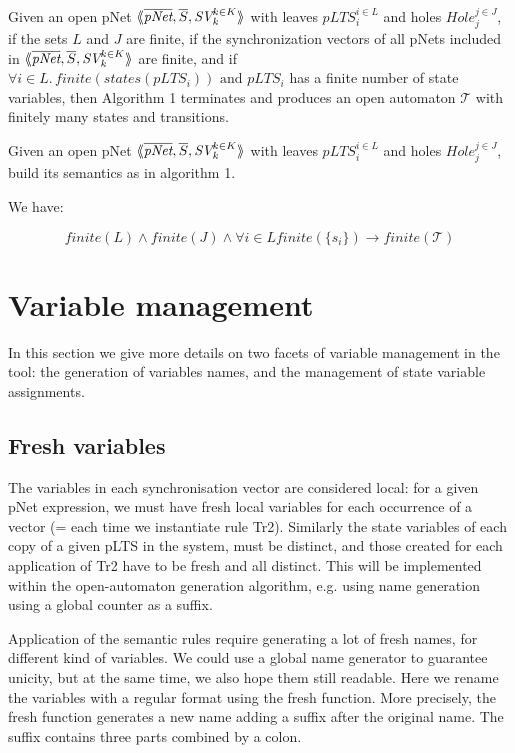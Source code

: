 \documentclass{lncs/llncs}
\begin{document}
\begin{theorem}\\
Given an open pNet $\mylangle \overline{\pNet},\overline{S}, \symb{SV}_k^{k\in K}\myrangle$ with leaves $pLTS_i^{i\in L}$ and holes $Hole_j^{j\in
  J}$, if the sets $L$ and $J$ are finite, if the synchronization vectors of all pNets 
  included in  $\mylangle \overline{\pNet},\overline{S}, \symb{SV}_k^{k\in K}\myrangle$ 
  are finite, and if
$\forall i \in L.\, finite{(states(pLTS_i))} \text{ and } pLTS_i$
has a finite number of state variables, then Algorithm 1 terminates
and produces an open automaton 
$\mathcal{T}$ with finitely many states and transitions.


Given an open pNet $\mylangle \overline{\pNet},\overline{S}, \symb{SV}_k^{k\in
    K}\myrangle$ with leaves $pLTS_i^{i\in L}$ and holes $Hole_j^{j\in
  J}$,
build its semantics as in algorithm 1.

We have:

$$ finite{(L)} \land finite{(J)} \land \forall i \in L finite{(\{s_i\})}
  \to finite{(\mathcal{T})}$$
\end{theorem}


\section{Variable management}
In this section we give more details on two facets of variable
management in the tool: the generation of variables names, and the
management of state variable assignments.

\subsection{Fresh variables}
\label{appendix:variables}
The variables in each synchronisation vector are considered local: for
a given pNet expression, we must have fresh local variables for each
occurrence of a vector (= each time we instantiate rule
Tr2). Similarly the state variables of each copy of a given pLTS in
the system, must be distinct, and those created for each application
of Tr2 have to be fresh and all distinct. This will be implemented
within the open-automaton generation algorithm, e.g. using name
generation using a global counter as a suffix.

Application of the semantic rules require generating a lot of fresh
names, for different kind of variables. We could use a global name
generator to guarantee unicity, but 
at the same time, we also hope them still
readable. Here we rename the variables with a regular format using the fresh function.
More precisely, the fresh function generates a new name adding a
suffix after the original name. The suffix contains three parts
combined by a colon.  
\end{document}
